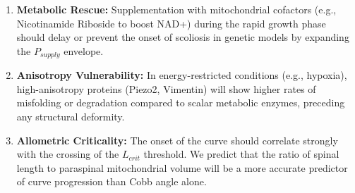 \begin{enumerate}
    \item \textbf{Metabolic Rescue:} Supplementation with mitochondrial cofactors (e.g., Nicotinamide Riboside to boost NAD+) during the rapid growth phase should delay or prevent the onset of scoliosis in genetic models by expanding the $P_{supply}$ envelope.
    \item \textbf{Anisotropy Vulnerability:} In energy-restricted conditions (e.g., hypoxia), high-anisotropy proteins (Piezo2, Vimentin) will show higher rates of misfolding or degradation compared to scalar metabolic enzymes, preceding any structural deformity.
    \item \textbf{Allometric Criticality:} The onset of the curve should correlate strongly with the crossing of the $L_{crit}$ threshold. We predict that the ratio of spinal length to paraspinal mitochondrial volume will be a more accurate predictor of curve progression than Cobb angle alone.
\end{enumerate}
